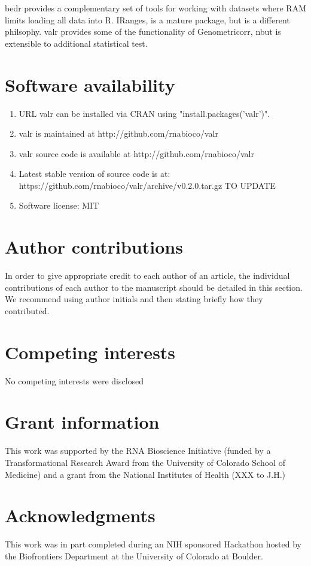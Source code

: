 \documentclass[9pt,a4paper]{extarticle}
\begin{document}
bedr provides a complementary set of tools for working with datasets where RAM limits loading all data into R. IRanges, is a mature package, but is a different philsophy. valr provides some of the functionality of Genometricorr, nbut is extensible to additional statistical test. 

\section*{Software availability}
\begin{enumerate}
\item URL valr can be installed via CRAN using "install.packages('valr')". 
\item valr is maintained at http://github.com/rnabioco/valr
\item valr source code is available at http://github.com/rnabioco/valr
\item Latest stable version of source code is at: https://github.com/rnabioco/valr/archive/v0.2.0.tar.gz TO UPDATE
\item Software license: MIT 
\end{enumerate}

\section*{Author contributions}
In order to give appropriate credit to each author of an article, the individual
contributions of each author to the manuscript should be detailed in this section. We
recommend using author initials and then stating briefly how they contributed.

\section*{Competing interests}
No competing interests were disclosed

\section*{Grant information}
This work was supported by the RNA Bioscience Initiative (funded by a Transformational Research Award from the University of Colorado School of Medicine) and a grant from the National Institutes of Health (XXX to J.H.)

\section*{Acknowledgments}
This work was in part completed during an NIH sponsored Hackathon hosted by the Biofrontiers Department at the University of Colorado at Boulder. 
\end{document}
